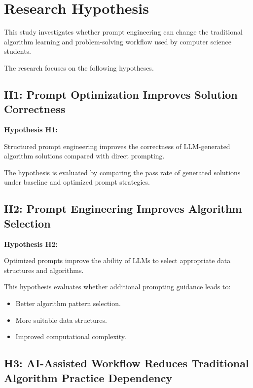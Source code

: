 \section{Research Hypothesis}


This study investigates whether prompt engineering can change the traditional
algorithm learning and problem-solving workflow used by computer science
students.


The research focuses on the following hypotheses.



\subsection{H1: Prompt Optimization Improves Solution Correctness}


\textbf{Hypothesis H1:}

Structured prompt engineering improves the correctness of LLM-generated
algorithm solutions compared with direct prompting.


The hypothesis is evaluated by comparing the pass rate of generated solutions
under baseline and optimized prompt strategies.



\subsection{H2: Prompt Engineering Improves Algorithm Selection}


\textbf{Hypothesis H2:}

Optimized prompts improve the ability of LLMs to select appropriate data
structures and algorithms.


This hypothesis evaluates whether additional prompting guidance leads to:

\begin{itemize}

\item Better algorithm pattern selection.

\item More suitable data structures.

\item Improved computational complexity.

\end{itemize}



\subsection{H3: AI-Assisted Workflow Reduces Traditional Algorithm Practice Dependency}


